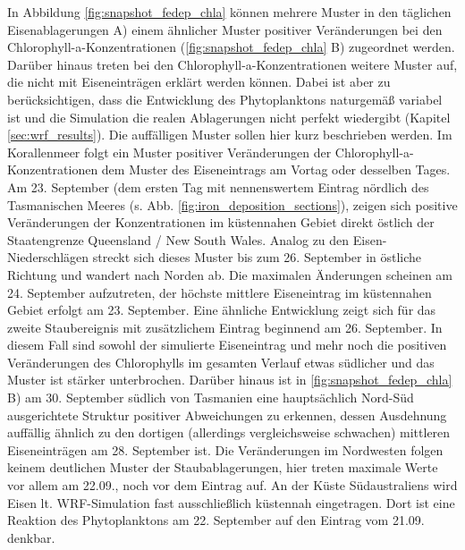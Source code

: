 \documentclass[12pt,a4paper,onecolumn]{scrartcl}
\begin{document}
In Abbildung \ref{fig:snapshot_fedep_chla} können mehrere Muster in den täglichen Eisenablagerungen A) einem ähnlicher Muster positiver Veränderungen bei den Chlorophyll-a-Konzentrationen (\ref{fig:snapshot_fedep_chla} B) zugeordnet werden. Darüber hinaus treten bei den Chlorophyll-a-Konzentrationen weitere Muster auf, die nicht mit Eiseneinträgen erklärt werden können. Dabei ist aber zu berücksichtigen, dass die Entwicklung des Phytoplanktons naturgemäß variabel ist und die Simulation die realen Ablagerungen nicht perfekt wiedergibt (Kapitel \ref{sec:wrf_results}). Die auffälligen Muster sollen hier kurz beschrieben werden. Im Korallenmeer folgt ein Muster positiver Veränderungen der Chlorophyll-a-Konzentrationen dem Muster des Eiseneintrags am Vortag oder desselben Tages. Am 23. September (dem ersten Tag mit nennenswertem Eintrag nördlich des Tasmanischen Meeres (s. Abb. \ref{fig:iron_deposition_sections}), zeigen sich positive Veränderungen der Konzentrationen im küstennahen Gebiet direkt östlich der Staatengrenze Queensland / New South Wales. Analog zu den Eisen-Niederschlägen streckt sich dieses Muster bis zum 26. September in östliche Richtung und wandert nach Norden ab. Die maximalen Änderungen scheinen am 24. September aufzutreten, der höchste mittlere Eiseneintrag im küstennahen Gebiet erfolgt am 23. September. Eine ähnliche Entwicklung zeigt sich für das  zweite Staubereignis mit zusätzlichem Eintrag beginnend am 26. September. In diesem Fall sind sowohl der simulierte Eiseneintrag und mehr noch die positiven Veränderungen des Chlorophylls im gesamten Verlauf etwas südlicher und das Muster ist stärker unterbrochen. Darüber hinaus ist in \ref{fig:snapshot_fedep_chla} B) am 30. September südlich von Tasmanien eine hauptsächlich Nord-Süd ausgerichtete Struktur positiver Abweichungen zu erkennen, dessen Ausdehnung auffällig ähnlich zu den dortigen (allerdings vergleichsweise schwachen) mittleren Eiseneinträgen am 28. September ist. Die Veränderungen im Nordwesten folgen keinem deutlichen Muster der Staubablagerungen, hier treten maximale Werte vor allem am 22.09., noch vor dem Eintrag auf. An der Küste Südaustraliens wird Eisen lt. WRF-Simulation fast ausschließlich küstennah eingetragen. Dort ist eine Reaktion des Phytoplanktons am 22. September auf den Eintrag vom 21.09. denkbar. \linebreak
\end{document}
